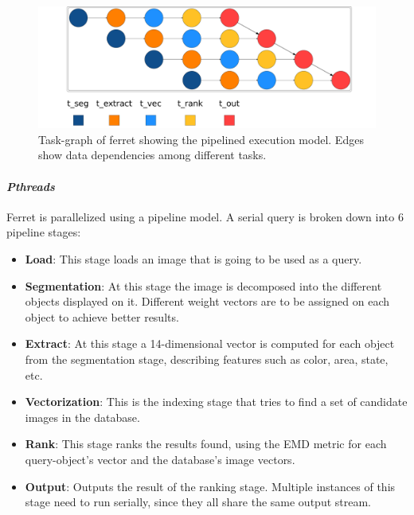 {\begin{figure}[t!]%
	\center
	\includegraphics[width=0.9\columnwidth]{ifcg/figures/ferret_tg}%
	\caption{Task-graph of ferret showing the pipelined execution model.  Edges show data dependencies among different tasks.}
	\label{fig:ferret_tg}%
	\vspace{.5cm}
\end{figure}

\paragraph{\textit{Pthreads}}
Ferret is parallelized using a pipeline model.  A serial query is broken down into 
6 pipeline stages:
\begin{itemize}
  \item \textbf{Load}:  This stage loads an image that is going to be used as a query.
  \item \textbf{Segmentation}:  At this stage the image is decomposed into the different objects displayed on it.
	Different weight vectors are to be assigned on each object to achieve better results.
  \item \textbf{Extract}:  At this stage a 14-dimensional vector is computed for each object from the segmentation stage, 
														describing features such as color, area, state, etc.
  \item \textbf{Vectorization}:  This is the indexing stage that tries to find a set of candidate images in the database.
  \item \textbf{Rank}:  This stage ranks the results found, using the EMD metric for each query-object's vector
	and the database's image vectors.
  \item \textbf{Output}:  Outputs the result of the ranking stage.  Multiple instances of
	this stage need to run serially, since they all share the same output stream.

\end{itemize}

}
